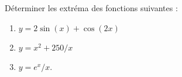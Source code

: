 \begin{exercice}\label{exoGeneral0012}

Déterminer les extréma des fonctions suivantes :
\begin{enumerate}

\item
$y=2\sin(x)+\cos(2x)$

\item
$y=x^2+250/x$

\item
$y=e^x/x$.

\end{enumerate}


\end{exercice}
